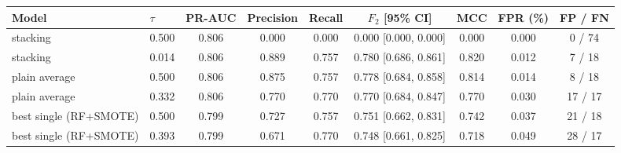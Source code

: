 \begin{tabular}{llccccccc}
\hline
Model & $\tau$ & PR-AUC & Precision & Recall & $F_2$ [95\% CI] & MCC & FPR (\%) & FP / FN \\
\hline
stacking & 0.500 & 0.806 & 0.000 & 0.000 & 0.000 [0.000, 0.000] & 0.000 & 0.000 & 0 / 74 \\
stacking & 0.014 & 0.806 & 0.889 & 0.757 & 0.780 [0.686, 0.861] & 0.820 & 0.012 & 7 / 18 \\
plain average & 0.500 & 0.806 & 0.875 & 0.757 & 0.778 [0.684, 0.858] & 0.814 & 0.014 & 8 / 18 \\
plain average & 0.332 & 0.806 & 0.770 & 0.770 & 0.770 [0.684, 0.847] & 0.770 & 0.030 & 17 / 17 \\
best single (RF+SMOTE) & 0.500 & 0.799 & 0.727 & 0.757 & 0.751 [0.662, 0.831] & 0.742 & 0.037 & 21 / 18 \\
best single (RF+SMOTE) & 0.393 & 0.799 & 0.671 & 0.770 & 0.748 [0.661, 0.825] & 0.718 & 0.049 & 28 / 17 \\
\hline
\end{tabular}
